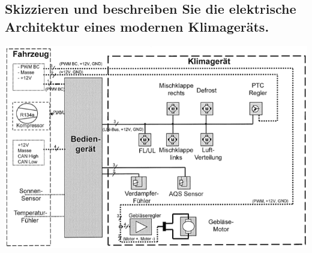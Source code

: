 \subsection{Skizzieren und beschreiben Sie die elektrische Architektur eines modernen Klimager\"ats.}
\includegraphics[width=\textwidth]{pics/architekturKlimaanlage}
